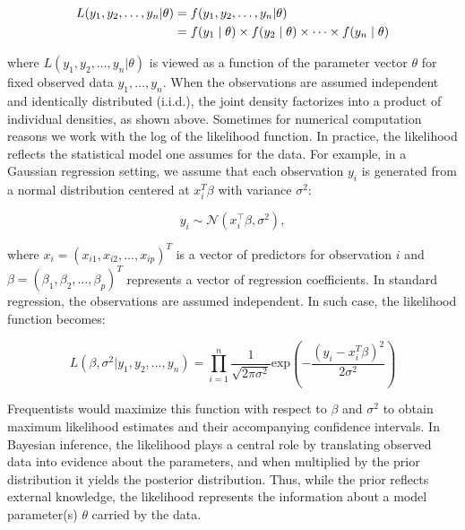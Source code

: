 \begin{align}
\label{bayes:likelihood_func}
L(y_1, y_2, \dots, y_n|\theta) 
    &= f(y_1, y_2, \dots, y_n|\theta) \notag\\
    &= f(y_1 \mid \theta) \times f(y_2 \mid \theta) \times \dots \times f(y_n \mid \theta)
\end{align}

\noindent
where \(L(y_1, y_2, \dots, y_n|\theta)\) is viewed as a function of the parameter vector \(\theta\) for fixed observed data \(y_1, \dots, y_n\)\cite{wackerly_mathematical_2008}. 
When the observations are assumed independent and identically distributed (i.i.d.), the joint density factorizes into a product of individual densities, as shown above.  
Sometimes for numerical computation reasons we work with the log of the likelihood function.  
In practice, the likelihood reflects the statistical model one assumes for the data. 
For example, in a Gaussian regression setting, we assume that each observation \(y_i\) is generated from a normal distribution centered at \(x_i^T\beta\) with variance \(\sigma^2\):

\[
y_i \sim \mathcal{N}(x_i^\top \beta, \sigma^2),
\]

where \(x_i = (x_{i1},x_{i2},\dots,x_{ip})^T\) is a vector of predictors for observation \(i\) and \(\beta = (\beta_1,\beta_2,\dots,\beta_p)^T\) represents a vector of regression coefficients.  
In standard regression, the observations are assumed independent.  
In such case, the likelihood function becomes:

\begin{equation}
    L\left(\beta,\sigma^2|y_1,y_2,\dots,y_n\right) = 
    \prod_{i=1}^{n}\frac{1}{\sqrt{2\pi\sigma^2}}\text{exp}\left(-\frac{(y_i-x_i^T\beta)^2}{2\sigma^2}\right)
\end{equation}

Frequentists would maximize this function with respect to \(\beta\) and \(\sigma^2\) to obtain maximum likelihood estimates and their accompanying confidence intervals.  
In Bayesian inference, the likelihood plays a central role by translating observed data into evidence about the parameters, and when multiplied by the prior distribution it yields the posterior distribution. 
Thus, while the prior reflects external knowledge, the likelihood represents the information about a model parameter(s) \(\theta\) carried by the data.

